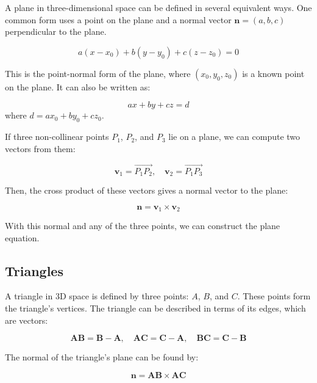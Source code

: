 A plane in three-dimensional space can be defined in several equivalent ways. One common form uses a point on the plane and a normal vector $\mathbf{n} = (a, b, c)$ perpendicular to the plane.

\begin{equation}
    a(x - x_0) + b(y - y_0) + c(z - z_0) = 0
\end{equation}

This is the point-normal form of the plane, where $(x_0, y_0, z_0)$ is a known point on the plane. It can also be written as:

\begin{equation}
    ax + by + cz = d
\end{equation}
where $d = ax_0 + by_0 + cz_0$.

If three non-collinear points $P_1$, $P_2$, and $P_3$ lie on a plane, we can compute two vectors from them:

\begin{equation}
    \mathbf{v}_1 = \overrightarrow{P_1P_2}, \quad \mathbf{v}_2 = \overrightarrow{P_1P_3}
\end{equation}

Then, the cross product of these vectors gives a normal vector to the plane:

\begin{equation}
    \mathbf{n} = \mathbf{v}_1 \times \mathbf{v}_2
\end{equation}

With this normal and any of the three points, we can construct the plane equation.

\subsection{Triangles}

A triangle in 3D space is defined by three points: $A$, $B$, and $C$. These points form the triangle's vertices. The triangle can be described in terms of its edges, which are vectors:

\begin{equation}
    \mathbf{AB} = \mathbf{B} - \mathbf{A}, \quad \mathbf{AC} = \mathbf{C} - \mathbf{A}, \quad \mathbf{BC} = \mathbf{C} - \mathbf{B}
\end{equation}

The normal of the triangle's plane can be found by:

\begin{equation}
    \mathbf{n} = \mathbf{AB} \times \mathbf{AC}
\end{equation}

